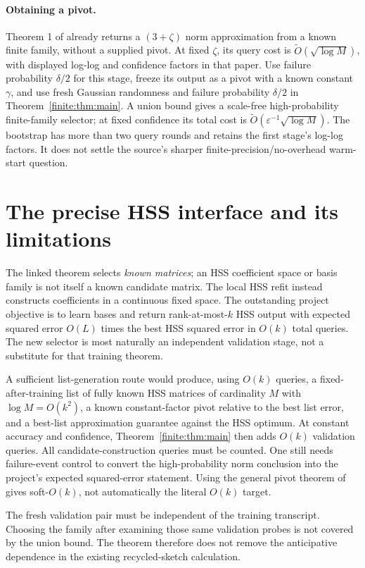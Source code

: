 \documentclass[11pt,oneside,openany,a4paper]{book}
\numberwithin{equation}{chapter}
\theoremstyle{definition}
\theoremstyle{remark}
\begin{document}
\paragraph{Obtaining a pivot.}
Theorem 1 of \cite{QESML} already returns a $(3+\zeta)$ norm approximation from a known finite family, without a supplied pivot. At fixed $\zeta$, its query cost is $\widetilde O(\sqrt{\log M})$, with displayed log-log and confidence factors in that paper. Use failure probability $\delta/2$ for this stage, freeze its output as a pivot with a known constant $\gamma$, and use fresh Gaussian randomness and failure probability $\delta/2$ in Theorem~\ref{finite:thm:main}. A union bound gives a scale-free high-probability finite-family selector; at fixed confidence its total cost is $\widetilde O(\varepsilon^{-1}\sqrt{\log M})$. The bootstrap has more than two query rounds and retains the first stage's log-log factors. It does not settle the source's sharper finite-precision/no-overhead warm-start question.

\section{The precise HSS interface and its limitations}
The linked theorem selects \emph{known matrices}; an HSS coefficient space or basis family is not itself a known candidate matrix. The local HSS refit instead constructs coefficients in a continuous fixed space. The outstanding project objective is to learn bases and return rank-at-most-$k$ HSS output with expected squared error $O(L)$ times the best HSS squared error in $O(k)$ total queries. The new selector is most naturally an independent validation stage, not a substitute for that training theorem.

A sufficient list-generation route would produce, using $O(k)$ queries, a fixed-after-training list of fully known HSS matrices of cardinality $M$ with $\log M=O(k^2)$, a known constant-factor pivot relative to the best list error, and a best-list approximation guarantee against the HSS optimum. At constant accuracy and confidence, Theorem~\ref{finite:thm:main} then adds $O(k)$ validation queries. All candidate-construction queries must be counted. One still needs failure-event control to convert the high-probability norm conclusion into the project's expected squared-error statement. Using the general pivot theorem of \cite{QESML} gives soft-$O(k)$, not automatically the literal $O(k)$ target.

The fresh validation pair must be independent of the training transcript. Choosing the family after examining those same validation probes is not covered by the union bound. The theorem therefore does not remove the anticipative dependence in the existing recycled-sketch calculation.
\end{document}
